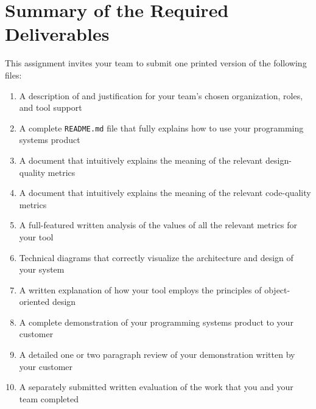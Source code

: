 \section*{Summary of the Required Deliverables}

This assignment invites your team to submit one printed version of the following files:

\vspace*{-.1in}
\begin{enumerate}
  \itemsep0em
  \item A description of and justification for your team's chosen organization, roles, and tool support
  \item A complete {\tt README.md} file that fully explains how to use your programming systems product
  \item A document that intuitively explains the meaning of the relevant design-quality metrics
  \item A document that intuitively explains the meaning of the relevant code-quality metrics
  \item A full-featured written analysis of the values of all the relevant metrics for your tool
  \item Technical diagrams that correctly visualize the architecture and design of your system
  \item A written explanation of how your tool employs the principles of object-oriented design
  \item A complete demonstration of your programming systems product to your customer
  \item A detailed one or two paragraph review of your demonstration written by your customer
  \item A separately submitted written evaluation of the work that you and your team completed
\end{enumerate}
\vspace*{-.1in}


